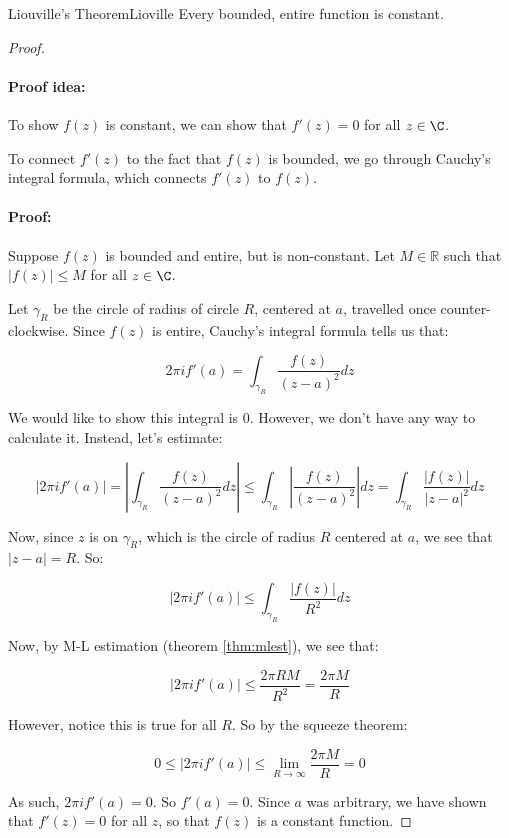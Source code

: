 \begin{thmbo}{Liouville's Theorem}{Lioville} Every bounded, entire function is constant.\end{thmbo}
\newpage
\begin{proof} ~
\paragraph{Proof idea:} To show $f(z)$ is constant, we can show that $f'(z) = 0$ for all $z \in \C$.

To connect $f'(z)$ to the fact that $f(z)$ is bounded, we go through Cauchy's integral formula, which connects $f'(z)$ to $f(z)$.

\paragraph{Proof:} 
Suppose $f(z)$ is bounded and entire, but is non-constant. Let $M \in \mathbb{R}$ such that $|f(z)| \le M$ for all $z\in \C$.

Let $\gamma_R$ be the circle of radius of circle $R$, centered at $a$, travelled once counter-clockwise. Since $f(z)$ is entire, Cauchy's integral formula tells us that:

$$2\pi i f'(a) = \int_{\gamma_R} \frac{f(z)}{(z-a)^2}dz$$

We would like to show this integral is $0$. However, we don't have any way to calculate it. Instead, let's estimate:

$$|2\pi i f'(a)| = \left| \int_{\gamma_R} \frac{f(z)}{(z-a)^2}dz\right| \le \int_{\gamma_R} \left|\frac{f(z)}{(z-a)^2}\right|dz = \int_{\gamma_R} \frac{|f(z)|}{|z-a|^2}dz$$

Now, since $z$ is on $\gamma_R$, which is the circle of radius $R$ centered at $a$, we see that $|z-a| = R$. So:

$$|2\pi i f'(a)| \le \int_{\gamma_R} \frac{|f(z)|}{R^2}dz$$

Now, by M-L estimation (theorem \ref{thm:mlest}), we see that:

$$|2\pi i f'(a)| \le \frac{2\pi RM}{R^2} = \frac{2\pi M}{R}$$


However, notice this is true for all $R$. So by the squeeze theorem:

$$0 \le |2\pi i f'(a)|\le \lim_{R\rightarrow \infty} \frac{2\pi M}{R} = 0$$

As such, $2\pi i f'(a) = 0$. So $f'(a) = 0$. Since $a$ was arbitrary, we have shown that $f'(z) = 0$ for all $z$, so that $f(z)$ is a constant function.

\end{proof}

